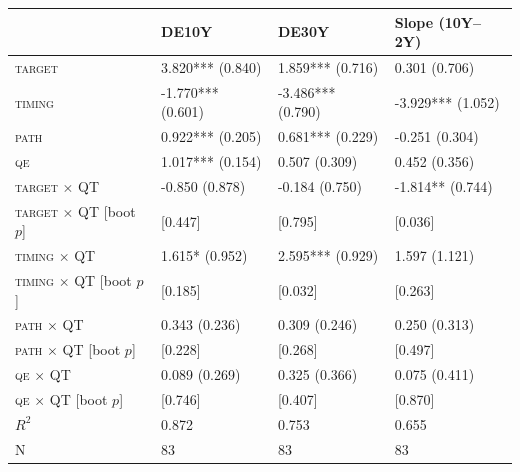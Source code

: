 \begin{tabular}{llll}
\toprule
 & DE10Y & DE30Y & Slope (10Y--2Y) \\
\midrule
\textsc{target} & 3.820*** (0.840) & 1.859*** (0.716) & 0.301 (0.706) \\
\textsc{timing} & -1.770*** (0.601) & -3.486*** (0.790) & -3.929*** (1.052) \\
\textsc{path} & 0.922*** (0.205) & 0.681*** (0.229) & -0.251 (0.304) \\
\textsc{qe} & 1.017*** (0.154) & 0.507 (0.309) & 0.452 (0.356) \\
\textsc{target} $\times$ QT & -0.850 (0.878) & -0.184 (0.750) & -1.814** (0.744) \\
\textsc{target} $\times$ QT [boot $p$] & [0.447] & [0.795] & [0.036] \\
\textsc{timing} $\times$ QT & 1.615* (0.952) & 2.595*** (0.929) & 1.597 (1.121) \\
\textsc{timing} $\times$ QT [boot $p$] & [0.185] & [0.032] & [0.263] \\
\textsc{path} $\times$ QT & 0.343 (0.236) & 0.309 (0.246) & 0.250 (0.313) \\
\textsc{path} $\times$ QT [boot $p$] & [0.228] & [0.268] & [0.497] \\
\textsc{qe} $\times$ QT & 0.089 (0.269) & 0.325 (0.366) & 0.075 (0.411) \\
\textsc{qe} $\times$ QT [boot $p$] & [0.746] & [0.407] & [0.870] \\
$R^2$ & 0.872 & 0.753 & 0.655 \\
N & 83 & 83 & 83 \\
\bottomrule
\end{tabular}
